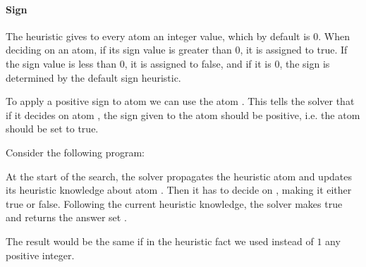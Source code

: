
\paragraph{Sign}

The  heuristic gives to every atom an integer  value, which by default is $0$.
When deciding on an atom, if its sign value is greater than $0$, it is assigned to true. 
If the sign value is less than 0, it is assigned to false, 
and if it is $0$, the sign is determined by the default sign heuristic.

To apply a positive sign to atom  we can use the atom . 
This tells the solver that if it decides on atom ,
the sign given to the atom should be positive, i.e. the atom should be set to true.
\begin{example}
\label{example:psign}
Consider the following program:

At the start of the search, 
the solver propagates the heuristic atom 
and updates its heuristic knowledge about atom .
Then it has to decide on , making it either true or false.
Following the current heuristic knowledge, 
the solver makes  true and returns the answer set .
\eexample
\end{example}

\begin{note}
The result would be the same if in the heuristic fact we used instead of $1$ any positive integer.
\end{note}


